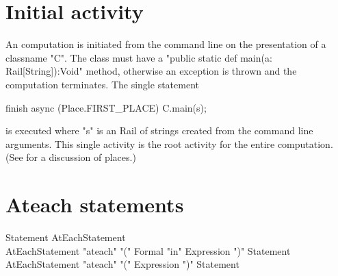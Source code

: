 


\section{Initial activity}\label{initial-computation}

An \Xten{} computation is initiated from the command line on the
presentation of a classname \xcd"C". The class must have a
\xcd"public static def main(a: Rail[String]):Void" method, otherwise an
exception is thrown
and the computation terminates.  The single statement
\begin{xten}
finish async (Place.FIRST_PLACE) {
  C.main(s);
}
\end{xten} 
\noindent is executed where \xcd"s" is an Rail of strings created
from the command line arguments. This single activity is the root activity
for the entire computation. (See  for a discussion of
places.)





\section{Ateach statements}\label{ateach-section}

\begin{grammar}
Statement \: AtEachStatement \\
AtEachStatement \:
      \xcd"ateach" \xcd"(" Formal \xcd"in" Expression \xcd")"
         Statement \\
AtEachStatement \:
      \xcd"ateach" \xcd"(" Expression \xcd")"
         Statement 
\end{grammar}

